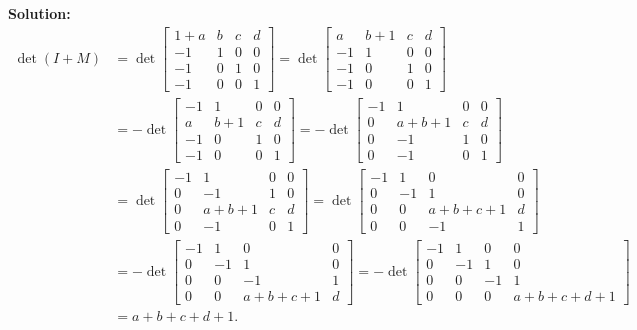 \documentclass[11pt]{article}
\newcommand\solution{\vspace{.10in}\textbf{Solution: }}
\begin{document}
\solution 
\begin{align*}
  \det (I+M)&=\det
  \begin{bmatrix}
    1+a&b&c&d\\
    -1&1&0&0\\
    -1&0&1&0\\
    -1&0&0&1
  \end{bmatrix}=\det
            \begin{bmatrix}
              a&b+1&c&d\\
             -1&1&0&0\\
             -1&0&1&0\\
             -1&0&0&1
            \end{bmatrix}
\\&=-\det
    \begin{bmatrix}
      -1&1&0&0\\
      a&b+1&c&d\\
      -1&0&1&0\\
      -1&0&0&1
    \end{bmatrix}=-\det
              \begin{bmatrix}
                -1&1&0&0\\
                0&a+b+1&c&d\\
                0&-1&1&0\\
0&-1&0&1
              \end{bmatrix}
\\&=\det
    \begin{bmatrix}
      -1&1&0&0\\
      0&-1&1&0\\
      0&a+b+1&c&d\\
     0&-1&0&1
    \end{bmatrix}=\det
             \begin{bmatrix}
               -1&1&0&0\\
               0&-1&1&0\\
               0&0&a+b+c+1&d\\
               0&0&-1&1
             \end{bmatrix}
\\&=-\det
    \begin{bmatrix}
      -1&1&0&0\\
     0&-1&1&0\\
     0&0&-1&1\\
     0&0&a+b+c+1&d
    \end{bmatrix}=-\det
                  \begin{bmatrix}
                    -1&1&0&0\\
0&-1&1&0\\
0&0&-1&1\\
0&0&0&a+b+c+d+1
                  \end{bmatrix}\\
&=a+b+c+d+1.
\end{align*}
\end{document}
